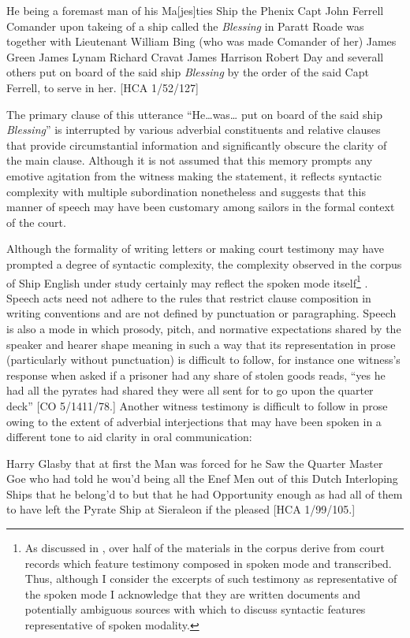 He being a foremast man of his Ma[jes]ties Ship the Phenix Capt John Ferrell Comander upon takeing of a ship called the \textit{Blessing} in Paratt Roade was together with Lieutenant William Bing (who was made Comander of her) James Green James Lynam Richard Cravat James Harrison Robert Day and severall others put on board of the said ship \textit{Blessing} by the order of the said Capt Ferrell, to serve in her. [HCA 1/52/127]

The primary clause of this utterance “He…was… put on board of the said ship \textit{Blessing}” is interrupted by various adverbial constituents and relative clauses that provide circumstantial information and significantly obscure the clarity of the main clause. Although it is not assumed that this memory prompts any emotive agitation from the witness making the statement, it reflects syntactic complexity with multiple subordination nonetheless and suggests that this manner of speech may have been customary among sailors in the formal context of the court. 

  Although the formality of writing letters or making court testimony may have prompted a degree of syntactic complexity, the complexity observed in the corpus of Ship English under study certainly may reflect the spoken mode itself\footnote{As discussed in , over half of the materials in the corpus derive from court records which feature testimony composed in spoken mode and transcribed. Thus, although I consider the excerpts of such testimony as representative of the spoken mode I acknowledge that they are written documents and potentially ambiguous sources with which to discuss syntactic features representative of spoken modality.} . Speech acts need not adhere to the rules that restrict clause composition in writing conventions and are not defined by punctuation or paragraphing. Speech is also a mode in which prosody, pitch, and normative expectations shared by the speaker and hearer shape meaning in such a way that its representation in prose (particularly without punctuation) is difficult to follow, for instance one witness’s response when asked if a prisoner had any share of stolen goods reads, “yes he had all the pyrates had shared they were all sent for to go upon the quarter deck” [CO 5/1411/78.] Another witness testimony is difficult to follow in prose owing to the extent of adverbial interjections that may have been spoken in a different tone to aid clarity in oral communication:

Harry Glasby that at first the Man was forced for he Saw the Quarter Master Goe who had told he wou’d being all the Enef Men out of this Dutch Interloping Ships that he belong’d to but that he had Opportunity enough as had all of them to have left the Pyrate Ship at Sieraleon if the pleased [HCA 1/99/105.]

